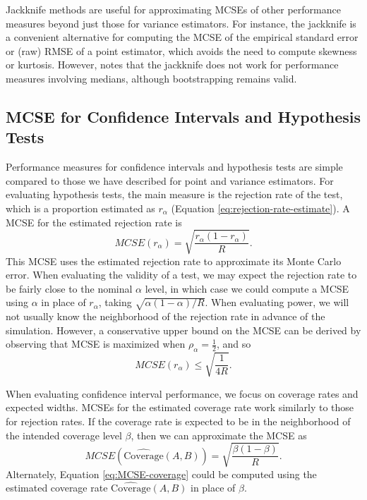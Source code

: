 \documentclass[
]{book}
\begin{document}
Jackknife methods are useful for approximating MCSEs of other performance measures beyond just those for variance estimators.
For instance, the jackknife is a convenient alternative for computing the MCSE of the empirical standard error or (raw) RMSE of a point estimator, which avoids the need to compute skewness or kurtosis.
However, \citet{boos2015Assessing} notes that the jackknife does not work for performance measures involving medians, although bootstrapping remains valid.

\subsection{MCSE for Confidence Intervals and Hypothesis Tests}\label{mcse-for-confidence-intervals-and-hypothesis-tests}

Performance measures for confidence intervals and hypothesis tests are simple compared to those we have described for point and variance estimators.
For evaluating hypothesis tests, the main measure is the rejection rate of the test, which is a proportion estimated as \(r_\alpha\) (Equation \eqref{eq:rejection-rate-estimate}).
A MCSE for the estimated rejection rate is
\[
MCSE(r_\alpha) = \sqrt{\frac{r_\alpha ( 1 - r_\alpha)}{R}}.
\label{eq:MCSE-rejection-rate}
\]
This MCSE uses the estimated rejection rate to approximate its Monte Carlo error.
When evaluating the validity of a test, we may expect the rejection rate to be fairly close to the nominal \(\alpha\) level, in which case we could compute a MCSE using \(\alpha\) in place of \(r_\alpha\), taking \(\sqrt{\alpha(1 - \alpha) / R}\).
When evaluating power, we will not usually know the neighborhood of the rejection rate in advance of the simulation.
However, a conservative upper bound on the MCSE can be derived by observing that MCSE is maximized when \(\rho_\alpha = \frac{1}{2}\), and so
\[
MCSE(r_\alpha) \leq \sqrt{\frac{1}{4 R}}.
\]

When evaluating confidence interval performance, we focus on coverage rates and expected widths.
MCSEs for the estimated coverage rate work similarly to those for rejection rates.
If the coverage rate is expected to be in the neighborhood of the intended coverage level \(\beta\), then we can approximate the MCSE as
\[
MCSE(\widehat{\text{Coverage}}(A,B)) = \sqrt{\frac{\beta(1 - \beta)}{R}}.
\label{eq:MCSE-coverage}
\]
Alternately, Equation \eqref{eq:MCSE-coverage} could be computed using the estimated coverage rate \(\widehat{\text{Coverage}}(A,B)\) in place of \(\beta\).
\end{document}

